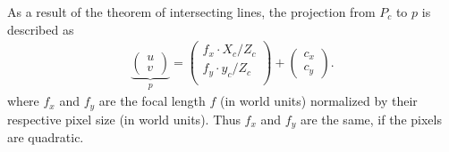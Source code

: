As a result of the theorem of intersecting lines, the projection from $P_c$ to $p$ is described as
\begin{align*}
\underbrace{\begin{pmatrix}
u\\
v
\end{pmatrix}}_{p}=
\begin{pmatrix}
f_x\cdot X_c/Z_c\\
f_y\cdot y_c/Z_c\\
\end{pmatrix}+
\begin{pmatrix}
c_x\\
c_y
\end{pmatrix}.
\end{align*}
where $f_x$ and $f_y$ are the focal length $f$ (in world units) normalized by their respective pixel size (in world units). Thus $f_x$ and $f_y$ are the same, if the pixels are quadratic.

